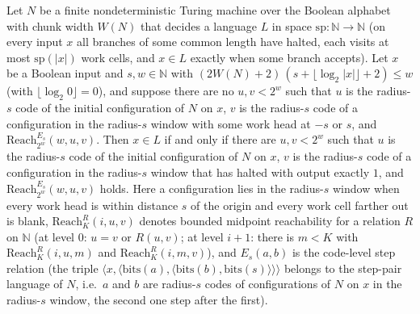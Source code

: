 \begin{theorem}
\label{Complexity.LogProg.SavitchARM.mem_iff_reach_of_noEdge}
\leanok
{}
Let $N$ be a finite nondeterministic Turing machine over the Boolean alphabet with chunk width
$W(N)$ that decides a language $L$ in space $\mathrm{sp}:\mathbb N\to\mathbb N$ (on every input
$x$ all branches of some common length have halted, each visits at most $\mathrm{sp}(|x|)$ work
cells, and $x\in L$ exactly when some branch accepts). Let $x$ be a Boolean input and
$s,w\in\mathbb N$ with $(2W(N)+2)\,(s+\lfloor\log_2|x|\rfloor+2)\le w$ (with
$\lfloor\log_2 0\rfloor=0$), and suppose there are no $u,v<2^w$ such that $u$ is the radius-$s$
code of the initial configuration of $N$ on $x$, $v$ is the radius-$s$ code of a configuration in
the radius-$s$ window with some work head at $-s$ or $s$, and
$\mathrm{Reach}_{2^w}^{E_s}(w,u,v)$. Then $x\in L$ if and only if there are $u,v<2^w$ such
that $u$ is the radius-$s$ code of the initial configuration of $N$ on $x$, $v$ is the radius-$s$
code of a configuration in the radius-$s$ window that has halted with output exactly $1$, and
$\mathrm{Reach}_{2^w}^{E_s}(w,u,v)$ holds. Here a configuration lies in the radius-$s$ window when every work head is within distance $s$ of the origin and every work cell farther out is blank, $\mathrm{Reach}_K^R(i,u,v)$ denotes bounded midpoint reachability for a relation $R$ on $\mathbb N$ (at level $0$: $u=v$ or $R(u,v)$; at level $i+1$: there is $m<K$ with $\mathrm{Reach}_K^R(i,u,m)$ and $\mathrm{Reach}_K^R(i,m,v)$), and $E_s(a,b)$ is the code-level step relation (the triple $\langle x,\langle\mathrm{bits}(a),\langle\mathrm{bits}(b),\mathrm{bits}(s)\rangle\rangle\rangle$ belongs to the step-pair language of $N$, i.e.\ $a$ and $b$ are radius-$s$ codes of configurations of $N$ on $x$ in the radius-$s$ window, the second one step after the first).
\end{theorem}
